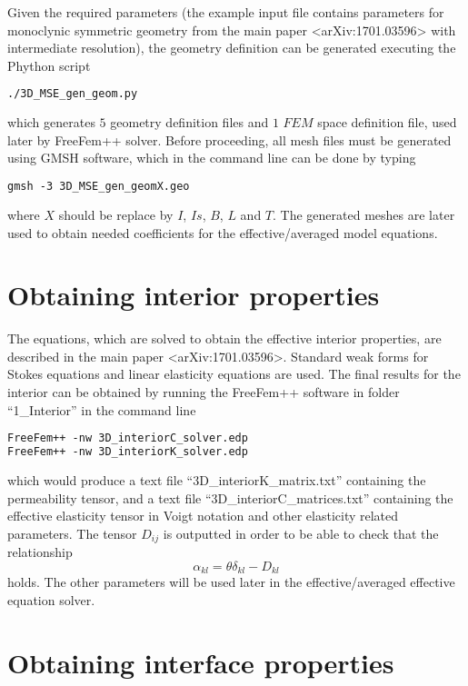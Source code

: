 \documentclass[12pt,a4paper]{article}
\begin{document}
Given the required parameters (the example input file contains parameters for monoclynic symmetric geometry from the main paper <arXiv:1701.03596> with intermediate resolution), the geometry definition can be generated executing the Phython script
\begin{lstlisting}[language=tex]
./3D_MSE_gen_geom.py
\end{lstlisting}
which generates $5$ geometry definition files and $1$ $FEM$ space definition file, used later by FreeFem++ solver. Before proceeding, all mesh files must be generated using GMSH software, which in the command line can be done by typing
\begin{lstlisting}[language=tex]
gmsh -3 3D_MSE_gen_geomX.geo
\end{lstlisting}
where $X$ should be replace by $I$, $Is$, $B$, $L$ and $T$. The generated meshes are later used to obtain needed coefficients for the effective/averaged model equations.

\section{Obtaining interior properties}

The equations, which are solved to obtain the effective interior properties, are described in the main paper <arXiv:1701.03596>. Standard weak forms for Stokes equations and linear elasticity equations are used. The final results for the interior can be obtained by running the FreeFem++ software in folder ``1\_Interior'' in the command line
\begin{lstlisting}[language=tex]
FreeFem++ -nw 3D_interiorC_solver.edp
FreeFem++ -nw 3D_interiorK_solver.edp
\end{lstlisting}
which would produce a text file ``3D\_interiorK\_matrix.txt'' containing the permeability tensor, and a text file ``3D\_interiorC\_matrices.txt'' containing the effective elasticity tensor in Voigt notation and other elasticity related parameters. The tensor $D_{ij}$ is outputted in order to be able to check that the relationship
\begin{equation}
\alpha_{kl} = \theta \delta_{kl} - D_{kl} \nonumber
\end{equation}
holds. The other parameters will be used later in the effective/averaged effective equation solver.

\section{Obtaining interface properties} \label{sec:presim-end}
\end{document}
